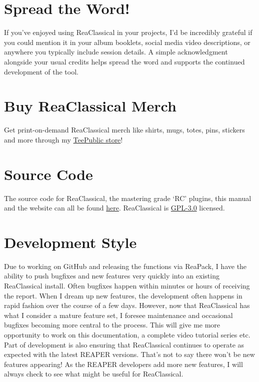\documentclass[10pt,american]{article}
\begin{document}
\section{Spread the Word!}

If you've enjoyed using ReaClassical in your projects, I'd be incredibly
grateful if you could mention it in your album booklets, social media video
descriptions, or anywhere you typically include session details. A simple
acknowledgment alongside your usual credits helps spread the word and supports
the continued development of the tool.

\section{Buy ReaClassical Merch}

Get print-on-demand ReaClassical merch like shirts, mugs, totes, pins, stickers
and more through my \href{https://www.teepublic.com/user/reaclassical}{TeePublic
store}!

\section{Source Code}

The source code for ReaClassical, the mastering grade `RC' plugins, this manual
and the website can all be found
\href{https://github.com/chmaha/ReaClassical}{here}. ReaClassical is
\href{https://www.gnu.org/licenses/gpl-3.0.html}{GPL-3.0} licensed.

\section{Development Style}

Due to working on GitHub and releasing the functions via ReaPack, I have the
ability to push bugfixes and new features very quickly into an existing
ReaClassical install. Often bugfixes happen within minutes or hours of receiving
the report. When I dream up new features, the development often happens in rapid
fashion over the course of a few days. However, now that ReaClassical has what I
consider a mature feature set, I foresee maintenance and occasional bugfixes
becoming more central to the process. This will give me more opportunity to work
on this documentation, a complete video tutorial series etc. Part of development
is also ensuring that ReaClassical continues to operate as expected with the
latest REAPER versions. That's not to say there won't be new features appearing!
As the REAPER developers add more new features, I will always check to see what
might be useful for ReaClassical. 
\end{document}
